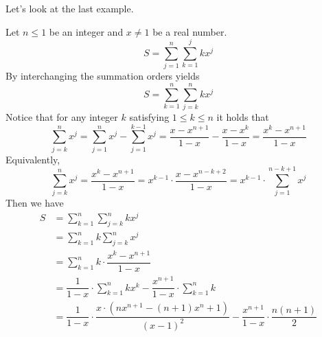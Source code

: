 Let's look at the last example.
\begin{eg}
	Let \(n \leq 1\) be an integer and \(x \neq 1\) be a real number. 
	\[
		S = \sum_{j = 1}^n \sum_{k = 1}^j kx^j
	\]
	By interchanging the summation orders yields
	\[
		S = \sum_{k = 1}^n \sum_{j = k}^n kx^j
	\]
	Notice that for any integer \(k\) satisfying \(1 \leq k \leq n\) it holds that
	\[
		\sum_{j = k}^n x^j = \sum_{j = 1}^n x^j - \sum_{j = 1}^{k - 1} x^j = \dfrac{x - x^{n + 1}}{1 - x} - \dfrac{x - x^k}{1 - x} = \dfrac{x^k - x^{n + 1}}{1 - x}
	\]
	Equivalently,
	\[
		\sum_{j = k}^n x^j = \dfrac{x^k - x^{n + 1}}{1 - x} = x^{k - 1} \cdot \dfrac{x - x^{n - k + 2}}{1 - x} = x^{k - 1} \cdot \sum_{j = 1}^{n - k + 1} x^j
	\]
	Then we have
	\[
		\begin{aligned}
			S &= \sum_{k = 1}^n \sum_{j = k}^n kx^j \\
			&= \sum_{k = 1}^n k \sum_{j = k}^n x^j \\
			&= \sum_{k = 1}^n k \cdot \dfrac{x^k - x^{n + 1}}{1 - x} \\
			&= \dfrac{1}{1 - x} \cdot \sum_{k = 1}^n kx^k - \dfrac{x^{n + 1}}{1 - x} \cdot \sum_{k = 1}^n k \\
			&= \dfrac{1}{1 - x} \cdot \dfrac{x\cdot(nx^{n + 1} - (n + 1)x^n + 1)}{(x - 1)^2} - \dfrac{x^{n + 1}}{1 - x} \cdot \dfrac{n(n + 1)}{2}
		\end{aligned}
	\]
\end{eg}

